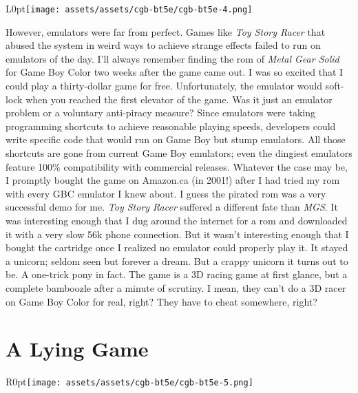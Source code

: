 \documentclass{book}
\begin{document}
\begin{wrapfigure}{L}{0pt}{\texttt{[image: assets/assets/cgb-bt5e/cgb-bt5e-4.png]}}\end{wrapfigure}\noindent
However, emulators were far from perfect. Games like \emph{Toy Story Racer} that abused the system in weird ways to achieve strange effects failed to run on emulators of the day. I’ll always remember finding the rom of \emph{Metal Gear Solid} for Game Boy Color two weeks after the game came out. I was so excited that I could play a thirty-dollar game for free. Unfortunately, the emulator would soft-lock when you reached the first elevator of the game. Was it just an emulator problem or a voluntary anti-piracy measure? Since emulators were taking programming shortcuts to achieve reasonable playing speeds, developers could write specific code that would run on Game Boy but stump emulators. All those shortcuts are gone from current Game Boy emulators; even the dingiest emulators feature 100\% compatibility with commercial releases. Whatever the case may be, I promptly bought the game on Amazon.ca (in 2001!) after I had tried my rom with every GBC emulator I knew about. I guess the pirated rom was a very successful demo for me. \emph{Toy Story Racer} suffered a different fate than \emph{MGS}. It was interesting enough that I dug around the internet for a rom and downloaded it with a very slow 56k phone connection. But it wasn’t interesting enough that I bought the cartridge once I realized no emulator could properly play it. It stayed a unicorn; seldom seen but forever a dream. But a crappy unicorn it turns out to be. A one-trick pony in fact. The game is a 3D racing game at first glance, but a complete bamboozle after a minute of scrutiny. I mean, they can’t do a 3D racer on Game Boy Color for real, right? They have to cheat somewhere, right?\par
\FloatBarrier\section*{A Lying Game}
\begin{wrapfigure}{R}{0pt}{\texttt{[image: assets/assets/cgb-bt5e/cgb-bt5e-5.png]}}\end{wrapfigure}
\end{document}
